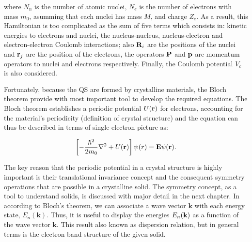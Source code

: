 where  $N_{n}$ is the number of atomic nuclei, $N_{e}$ is the number of electrons with mass $m_{0}$, asumming that each nuclei has mass $M$, and charge $Z_{e}$. As a result, this Hamiltonian is too complicated as the sum of five terms which consists in: kinetic energies to electrons and nuclei, the nucleus-nucleus, nucleus-electron and electron-electron Coulomb interactions; also $\mathrm{\bf R}_{i}$ are the positions of the nuclei and $\mathrm{\bf r}_{j}$ are the position of the electrons, the operators $\mathrm{\bf P}$ and $\mathrm{\bf p}$ are momentum operators to nuclei and electrons respectively.  Finally, the Coulomb potential $V_{c}$\cite{alloul2010introduction} is also considered.  

Fortunately, because  the QS are formed by crystalline materials, the Bloch theorem provide with most important tool to develop the required equations. The Bloch theorem establishes a periodic potential $U(\displaystyle\mathrm{\bf r})$ for electrons, accounting for the material's periodicity (definition of crystal structure) and the \sch equation can thus be described in terms of single electron picture as:  


\begin{equation}
	\left[-\dfrac{\hbar^2}{2m_{0}}\nabla^2 + U(\displaystyle\mathrm{\bf r})\right]\psi (r)=\displaystyle\mathrm{\bf E}\psi(\displaystyle\mathrm{\bf r}).
	\label{eq:chapter-1-first-sch}
\end{equation}

The key reason that the periodic potential in a crystal structure is highly important is their translational invariance concept and the consequent symmetry operations that are possible in a crystalline solid. The symmetry concept, as a  tool to understand solids, is discussed with major detail in the next chapter. In according to Bloch's theorem, we can associate a wave vector $\boldsymbol{k}$ with each energy state, $E_{n}(\boldsymbol{k})$. Thus, it is useful to display the energies $E_{n}(\bf{k})$ as a function of the wave vector $\boldsymbol{k}$. This result also known as dispersion relation, but in general terms is the electron band structure of the given solid\cite{piprek2017handbook}.   

